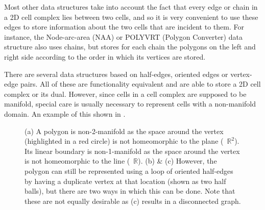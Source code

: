 Most other data structures take into account the fact that every edge or chain in a 2D cell complex lies between two cells, and so it is very convenient to use these edges to store information about the two cells that are incident to them.
For instance, the Node-arc-area (NAA) or POLYVRT (Polygon Converter) data structure \citep{Peucker75} also uses chains, but stores for each chain the polygons on the left and right side according to the order in which its vertices are stored.

There are several data structures based on half-edges, oriented edges or vertex-edge pairs.
All of these are functionality equivalent and are able to store a 2D cell complex or its dual.
However, since cells in a cell complex are supposed to be manifold, special care is usually necessary to represent cells with a non-manifold domain.
An example of this shown in .
\begin{figure}[tbp]
\centering
{}
\quad
{}
\quad
{}
\caption[Storing non-manifold polygons in a half-edge data structure]{(a) A polygon is non-2-manifold as the space around the vertex (highlighted in a red circle) is not homeomorphic to the plane (\ie\ $\mathbb{R}^2$).
Its linear boundary is non-1-manifold as the space around the vertex is not homeomorphic to the line (\ie\ $\mathbb{R}$).
(b) \& (c) However, the polygon can still be represented using a loop of oriented half-edges by having a duplicate vertex at that location (shown as two half balls), but there are two ways in which this can be done.
Note that these are not equally desirable as (c) results in a disconnected graph.}
\label{fig:nonmanifold-012}
\end{figure}

